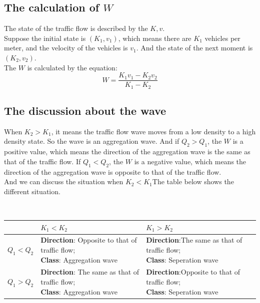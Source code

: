 \documentclass{mcmthesis}
\begin{document}
\subsection{The calculation of $W$}
\indent The state of the traffic flow is described by the $K,v$.\\
\indent Suppose the initial state is $(K_{1}, v_{1})$, which means there are $K_{1}$ vehicles per meter, and the velocity of the vehicles is $v_{1}$. And the state of the next moment is $(K_{2}, v_{2})$. \\
\indent The $W$ is calculated by the equation:
\begin{equation}
	W=\frac{K_{1}v_{1}-K_{2}v_{2}}{K_{1}-K_{2}}
\end{equation}
\subsection{The discussion about the wave}
When $K_{2}>K_{1}$, it means the traffic flow wave moves from a low density to a high density state. So the wave is an aggregation wave. And if $ Q_{2}>Q_{1} $, the $W$ is a positive value, which means the direction of the aggregation wave is the same as that of the traffic flow. If $ Q_{1}<Q_{2} $, the $W$ is a negative value, which means the direction of the aggregation wave is opposite to that of the traffic flow. \\
\indent And we can discuss the situation when $K_{2}<K_{1}$The table below shows the different situation.\\
\begin{table}[H]
        \setlength{\abovecaptionskip}{0pt}
        \setlength{\belowcaptionskip}{0pt}
		\\
        \begin{tabular}{p{2.7cm}<{\centering}|p{5.5cm}<{\centering}|p{5.5cm}<{\centering}|}
		\hline
		\rowcolor[gray]{0.9}\bf{}	&\bf{$K_{1}<K_{2}$}&\bf{$K_{1}>K_{2}$}	\\
		\hline
		$ Q_{1}<Q_{2} $	 & \makecell[{}{p{5.5cm}}]{\textbf{Direction}: Opposite to that of traffic flow;\\  \textbf{Class}: Aggregation wave  } &\makecell[{}{p{5.5cm}}]{\textbf{Direction}:The same as that of traffic flow;\\ \textbf{Class}: Seperation wave}\\
		\hline
		$Q_{1}>Q_{2} $  & \makecell[{}{p{5.5cm}}]{\textbf{Direction}: The same as that of traffic flow;\\  \textbf{Class}: Aggregation wave  }  
		&\makecell[{}{p{5.5cm}}]{\textbf{Direction}:Opposite to that of traffic flow;\\ \textbf{Class}: Seperation wave}\\
		\hline
	\end{tabular}
\end{table}
\end{document}
